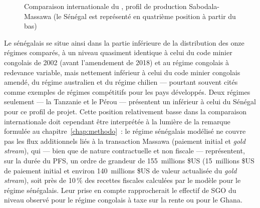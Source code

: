 \begin{figure}[H]
\centering
{}
\caption{Comparaison internationale du \TEMI{}, profil de production Sabodala-Massawa (le Sénégal est représenté en quatrième position à partir du bas)}
\label{fig:temi}
\end{figure}

Le \TEMI{} sénégalais se situe ainsi dans la partie inférieure de la distribution des onze régimes comparés, à un niveau quasiment identique à celui du code minier congolais de 2002 (avant l'amendement de 2018) et au régime congolais à redevance variable, mais nettement inférieur à celui du code minier congolais amendé, du régime australien et du régime chilien --- pourtant souvent cités comme exemples de régimes compétitifs pour les pays développés. Deux régimes seulement --- la Tanzanie et le Pérou --- présentent un \TEMI{} inférieur à celui du Sénégal pour ce profil de projet. Cette position relativement basse dans la comparaison internationale doit cependant être interprétée à la lumière de la remarque formulée au chapitre~\ref{chap:methodo}~: le régime sénégalais modélisé ne couvre pas les flux additionnels liés à la transaction Massawa (paiement initial et \emph{gold stream}), qui --- bien que de nature contractuelle et non fiscale --- représentent, sur la durée du PFS, un ordre de grandeur de 155~millions \$US (15~millions \$US de paiement initial et environ 140~millions \$US de valeur actualisée du \emph{gold stream}), soit près de 10\,\% des recettes fiscales calculées par le modèle pour le régime sénégalais. Leur prise en compte rapprocherait le \TEMI{} effectif de SGO du niveau observé pour le régime congolais à taxe sur la rente ou pour le Ghana.


